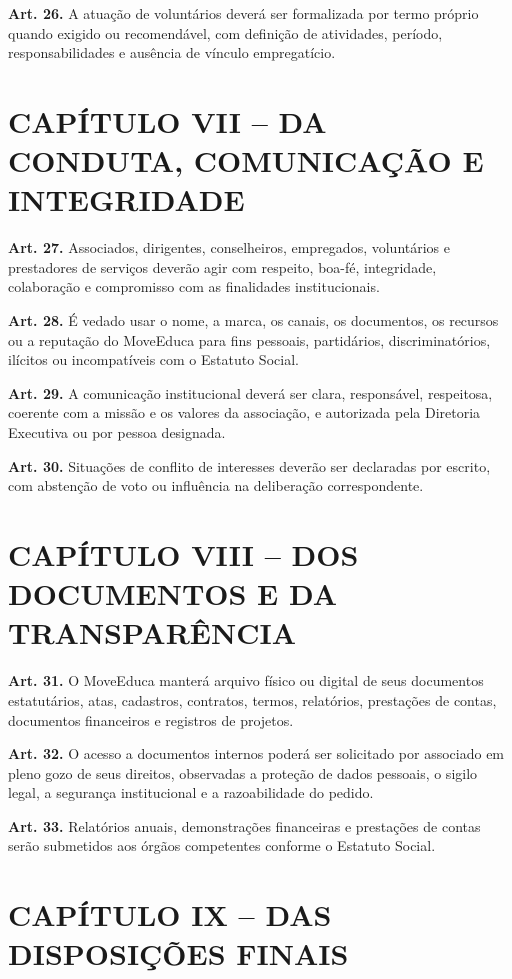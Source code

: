 \documentclass[11pt,a4paper]{article}
\begin{document}
\textbf{Art. 26.} A atuação de voluntários deverá ser formalizada por termo próprio quando exigido ou recomendável, com definição de atividades, período, responsabilidades e ausência de vínculo empregatício.

\section*{CAPÍTULO VII -- DA CONDUTA, COMUNICAÇÃO E INTEGRIDADE}

\textbf{Art. 27.} Associados, dirigentes, conselheiros, empregados, voluntários e prestadores de serviços deverão agir com respeito, boa-fé, integridade, colaboração e compromisso com as finalidades institucionais.

\textbf{Art. 28.} É vedado usar o nome, a marca, os canais, os documentos, os recursos ou a reputação do MoveEduca para fins pessoais, partidários, discriminatórios, ilícitos ou incompatíveis com o Estatuto Social.

\textbf{Art. 29.} A comunicação institucional deverá ser clara, responsável, respeitosa, coerente com a missão e os valores da associação, e autorizada pela Diretoria Executiva ou por pessoa designada.

\textbf{Art. 30.} Situações de conflito de interesses deverão ser declaradas por escrito, com abstenção de voto ou influência na deliberação correspondente.

\section*{CAPÍTULO VIII -- DOS DOCUMENTOS E DA TRANSPARÊNCIA}

\textbf{Art. 31.} O MoveEduca manterá arquivo físico ou digital de seus documentos estatutários, atas, cadastros, contratos, termos, relatórios, prestações de contas, documentos financeiros e registros de projetos.

\textbf{Art. 32.} O acesso a documentos internos poderá ser solicitado por associado em pleno gozo de seus direitos, observadas a proteção de dados pessoais, o sigilo legal, a segurança institucional e a razoabilidade do pedido.

\textbf{Art. 33.} Relatórios anuais, demonstrações financeiras e prestações de contas serão submetidos aos órgãos competentes conforme o Estatuto Social.

\section*{CAPÍTULO IX -- DAS DISPOSIÇÕES FINAIS}
\end{document}
